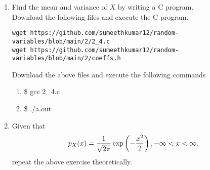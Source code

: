 \documentclass[journal,12pt,twocolumn]{IEEEtran}
\begin{document}
\begin{enumerate}[label=\thesection.\arabic*
,ref=\thesection.\theenumi]
\begin{enumerate}
    \item \$ python3 2\_3.py
\end{enumerate}
\begin{figure}[!h]
\centering
\texttt{[image: 2\_3pdfgau.png]}
\caption{The PDF of $X$}
\label{fig:2.3}
\end{figure}
Some of the properties of the PDF:
\begin{enumerate}
    \item Symmetric about $x=\mu$
    \item decreasing function for $x<\mu$ and increasing for $x>\mu$ and attains maximum at $x=\mu$
    \item Area under the curve is unity.
    
\end{enumerate}
\item Find the mean and variance of $X$ by writing a C program.\\
\solution Download the following files and execute the  C program.
\begin{lstlisting}
wget https://github.com/sumeethkumar12/random-variables/blob/main/2/2_4.c
wget https://github.com/sumeethkumar12/random-variables/blob/main/2/coeffs.h
\end{lstlisting}
Download the above files and execute the following commands
\begin{enumerate}
    \item \$ gcc 2\_4.c
    \item \$ ./a.out
    \end{enumerate}
\item Given that 
\begin{align}
p_{X}(x) = \frac{1}{\sqrt{2\pi}}\exp\left(-\frac{x^2}{2}\right), -\infty < x < \infty,
\end{align}
repeat the above exercise theoretically.
\end{enumerate}
\solution 
\end{document}
